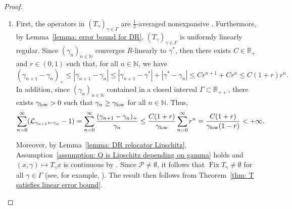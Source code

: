 \documentclass[a4paper,12pt]{article}
\DeclareMathOperator{\Fix}{Fix}
\begin{document}
\begin{proof}
\begin{enumerate}[(\ref{cor:fixed-point-convergence})]
    \item First, %
    the operators in $(T_\gamma)_{\gamma\in\Gamma}$ are $\frac{1}{2}$-averaged nonexpansive \cite[Remark~4.34(iii)]{bauschke2017convex}. Furthermore, by Lemma~\ref{lemma: error bound for DR}, $(T_{\gamma})_{\gamma\in\Gamma}$ is uniformly linearly regular.  Since $(\gamma_n)_{n\in\mathbb{N}}$ converges $R$-linearly to $\gamma^*$, then there exists $C\in\mathbb{R}_{+}$ and $r\in(0,1)$ such that, for all $n\in\mathbb{N}$, we have
\begin{equation} \label{eq:rate-diff}
    (\gamma_{n+1}-\gamma_n)_+ \leq |\gamma_{n+1}-\gamma_n|\leq|\gamma_{n+1}-\gamma^*|+|\gamma^*-\gamma_n|\leq Cr^{n+1}+Cr^n\leq C(1+r)r^n.
\end{equation}
In addition, since $(\gamma_n)_{n\in\mathbb{N}}$ contained in a closed interval $\Gamma\subset\mathbb{R}_{++}$, there exists $\gamma_{\rm low}>0$ such that $\gamma_n\geq\gamma_{\rm low}$ for all $n\in\mathbb{N}$. 
Thus,
$$\sum_{n=0}^\infty(\mathcal{L}_{\gamma_{n+1}\leftarrow\gamma_n}-1)=\sum_{n=0}^\infty\frac{(\gamma_{n+1}-\gamma_n)_+}{\gamma_n}\leq\frac{C(1+r)}{\gamma_{\rm low}} \sum_{n=0}^\infty r^n=\frac{C(1+r)}{\gamma_{\rm low}(1-r)}<+\infty.$$ 
     
    Moreover, by Lemma~\ref{lemma: DR relocator Lipschitz}, Assumption~\ref{assumption: Q is Lipschitz depending on gamma} holds and $(x,\gamma)\mapsto T_{\gamma}x$ is continuous by \cite[Corollary~3.6]{atenas2025relocated}. Since $\mathcal{P}\neq\emptyset$, it follows that $\Fix T_{\gamma}\neq\emptyset$ for all $\gamma\in\Gamma$ (see, for example, \cite[Lemma~4.2]{malitsky2023resolvent}).  The result then follows from Theorem~\ref{thm: T satisfies linear error bound}.
    

\end{enumerate}
\end{proof}
\end{document}
